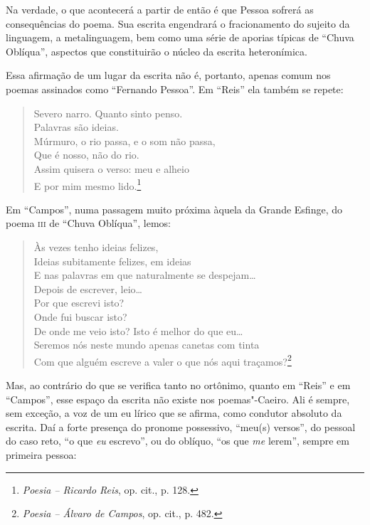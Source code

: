 Na verdade, o que acontecerá a partir de então é que Pessoa sofrerá as
consequências do poema. Sua escrita engendrará o fracionamento do
sujeito da linguagem, a metalinguagem, bem como uma série de aporias
típicas de ``Chuva Oblíqua'', aspectos que constituirão o núcleo da
escrita heteronímica.

Essa afirmação de um lugar da escrita não é, portanto, apenas comum nos
poemas assinados como ``Fernando Pessoa''. Em ``Reis'' ela também se
repete:

\begin{verse}
Severo narro. Quanto sinto penso.\\
Palavras são ideias.\\
Múrmuro, o rio passa, e o som não passa,\\
Que é nosso, não do rio.\\
Assim quisera o verso: meu e alheio\\
E por mim mesmo lido.\footnote{\emph{Poesia -- Ricardo Reis}, op. cit.,
  p. 128.}
\end{verse}

Em ``Campos'', numa passagem muito próxima àquela da Grande Esfinge, do
poema \textsc{iii} de ``Chuva Oblíqua'', lemos:

\begin{verse}
Às vezes tenho ideias felizes,\\
Ideias subitamente felizes, em ideias\\
E nas palavras em que naturalmente se \qb{}despejam\ldots{}\\[5pt]
Depois de escrever, leio\ldots{}\\
Por que escrevi isto?\\
Onde fui buscar isto?\\
De onde me veio isto? Isto é melhor do que \qb{}eu\ldots{}\\[5pt]
Seremos nós neste mundo apenas canetas \qb{}com tinta\\
Com que alguém escreve a valer o que nós \qb{}aqui traçamos?\footnote{\emph{Poesia
  -- Álvaro de Campos}, op. cit., p. 482.}
\end{verse}

Mas, ao contrário do que se verifica tanto no ortônimo, quanto em
``Reis'' e em ``Campos'', esse espaço da escrita não existe nos
poemas"-Caeiro. Ali é sempre, sem exceção, a voz de um eu lírico que se
afirma, como condutor absoluto da escrita. Daí a forte presença do
pronome possessivo, ``meu(s) versos'', do pessoal do caso reto, ``o que
\emph{eu} escrevo'', ou do oblíquo, ``os que \emph{me} lerem'', sempre
em primeira pessoa:

